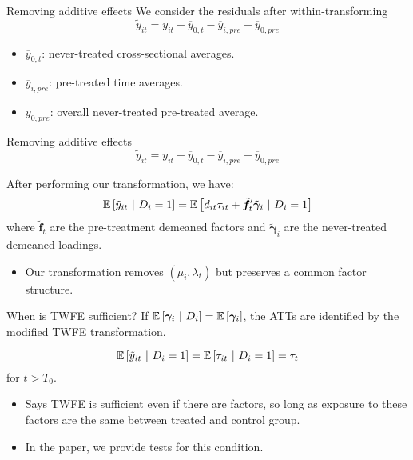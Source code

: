 \documentclass[aspectratio=43,t]{beamer}
\begin{document}
\begin{frame}{Removing additive effects}
  We consider the residuals after within-transforming
  $$
    \tilde{y}_{it} = y_{it} - \overline{y}_{0,t} - \overline{y}_{i,pre} + \overline{y}_{0,pre}
  $$

  \begin{itemize}
    \item $\overline{y}_{0,t}$: never-treated cross-sectional averages.
    \item $\overline{y}_{i,pre}$: pre-treated time averages.
    \item $\overline{y}_{0,pre}$: overall never-treated pre-treated average.
  \end{itemize}

\end{frame}

\begin{frame}{Removing additive effects}
  $$
    \tilde{y}_{it} = y_{it} - \overline{y}_{0,t} - \overline{y}_{i,pre} + \overline{y}_{0,pre}
  $$

  After performing our transformation, we have:
  $$
    \mathbb{E}\left[\tilde{y}_{it} \ \vert \ D_i = 1\right] = \mathbb{E}\left[d_{it} \tau_{it} + \tilde{\bm f}_t' \tilde{\bm \gamma}_i  \ \vert \ D_i = 1\right]
  $$
  where $\tilde{\bm f}_t$ are the pre-treatment demeaned factors and $\tilde{\bm \gamma}_i$ are the never-treated demeaned loadings.

  \begin{itemize}
    \item Our transformation removes $(\mu_i, \lambda_t)$ but preserves a common factor structure.
  \end{itemize}
\end{frame}

\begin{frame}{When is TWFE sufficient?}
  If $\mathbb{E}\left[\bm \gamma_i \ \vert \ D_i\right] = \mathbb{E}\left[\bm \gamma_i\right]$, the ATTs are identified by the modified TWFE transformation.

  \begin{equation}
    \mathbb{E}\left[\tilde{y}_{it} \ \vert \ D_i = 1\right] = \mathbb{E}\left[\tau_{it} \ \vert \ D_i = 1\right] = \tau_t
  \end{equation}
  for $t > T_0$.

  \pause
  \begin{itemize}
    \item Says TWFE is sufficient even if there are factors, so long as exposure to these factors are the same between treated and control group.
    \item In the paper, we provide tests for this condition.
  \end{itemize}
\end{frame}
\end{document}
